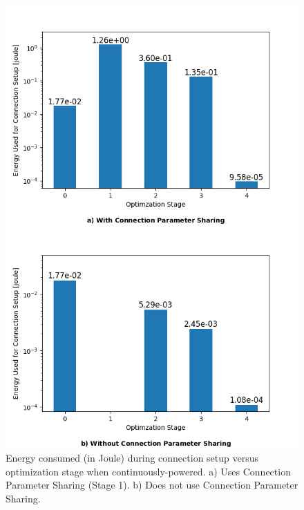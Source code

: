 \begin{figure}[]
    \centering
    \begin{minipage}[b]{0.47\textwidth}
      \includegraphics[width=\textwidth]{plots/static_power_consumption_conventional.png}
    \end{minipage}
    \hfill
    \begin{minipage}[b]{0.47\textwidth}
        \includegraphics[width=\textwidth]{plots/static_power_consumption_conventional_fast.png}
    \end{minipage}
    \caption{Energy consumed (in Joule) during connection setup versus optimization stage when continuously-powered. a) Uses Connection Parameter Sharing (Stage 1). b) Does not use Connection Parameter Sharing.}
    \label{fig:static_power_consumption_conventional}
\end{figure}


